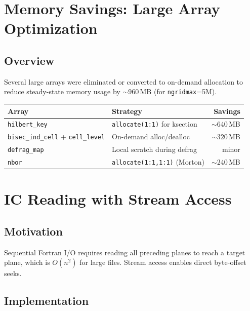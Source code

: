 \documentclass[11pt,fleqn]{book}
\begin{document}
\chapter{Memory Savings: Large Array Optimization}

\section{Overview}

Several large arrays were eliminated or converted to on-demand allocation to reduce steady-state memory usage by ${\sim}960$\,MB (for \texttt{ngridmax}=5M).

\begin{center}
\begin{tabular}{llr}
\toprule
\textbf{Array} & \textbf{Strategy} & \textbf{Savings} \\
\midrule
\texttt{hilbert\_key} & \texttt{allocate(1:1)} for ksection & ${\sim}640$\,MB \\
\texttt{bisec\_ind\_cell} + \texttt{cell\_level} & On-demand alloc/dealloc & ${\sim}320$\,MB \\
\texttt{defrag\_map} & Local scratch during defrag & minor \\
\texttt{nbor} & \texttt{allocate(1:1,1:1)} (Morton) & ${\sim}240$\,MB \\
\bottomrule
\end{tabular}
\end{center}


\chapter{IC Reading with Stream Access}

\section{Motivation}

Sequential Fortran I/O requires reading all preceding planes to reach a target plane, which is $O(n^2)$ for large files. Stream access enables direct byte-offset seeks.

\section{Implementation}
\end{document}
